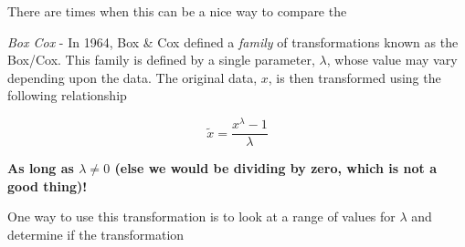 \documentclass[
  letterpaper,
]{book}
\newenvironment{Shaded}{\begin{snugshade}}{\end{snugshade}}
\newcommand{\FunctionTok}[1]{\textcolor[rgb]{0.28,0.35,0.67}{#1}}
\newcommand{\NormalTok}[1]{\textcolor[rgb]{0.00,0.23,0.31}{#1}}
\newcommand{\OtherTok}[1]{\textcolor[rgb]{0.00,0.23,0.31}{#1}}
\newcommand{\SpecialCharTok}[1]{\textcolor[rgb]{0.37,0.37,0.37}{#1}}
\begin{document}
\begin{Shaded}
\end{Shaded}

There are times when this can be a nice way to compare the

\emph{Box Cox} - In 1964, Box \& Cox defined a \emph{family} of
transformations known as the Box/Cox. This family is defined by a single
parameter, \(\lambda\), whose value may vary depending upon the data.
The original data, \(x\), is then transformed using the following
relationship

\[
\tilde{x} = \frac{x^\lambda - 1}{\lambda}
\]

\textbf{As long as \(\lambda \ne 0\) (else we would be dividing by zero,
which is not a good thing)!}

One way to use this transformation is to look at a range of values for
\(\lambda\) and determine if the transformation
\end{document}
